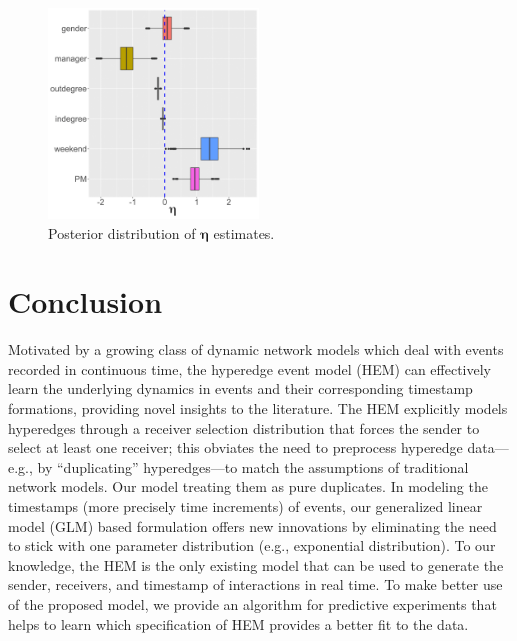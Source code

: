 \documentclass[ba]{imsart}
\numberwithin{equation}{section}
\theoremstyle{plain}
\begin{document}
			\begin{figure}[!t]
				\centering
				\includegraphics[width=0.4975\textwidth]{img/etaplotnew-1.png}	
				\caption {Posterior distribution of $\boldsymbol{\eta}$ estimates.}
				\label{figure:etaresults}
			\end{figure}	
	\section{Conclusion}\label{sec:conclusion}
	Motivated by a growing class of dynamic network models which deal with events recorded in continuous time, the hyperedge event model (HEM) can effectively learn the underlying dynamics in events and their corresponding timestamp formations, providing novel insights to the literature. The HEM explicitly models hyperedges through a receiver selection distribution that forces the sender to select at least one receiver; this obviates the need to preprocess hyperedge data---e.g., by ``duplicating'' hyperedges---to match the assumptions of traditional network models. Our model treating them as pure duplicates. In modeling the timestamps (more precisely time increments) of events, our generalized linear model (GLM) based formulation offers new innovations by eliminating the need to stick with one parameter distribution (e.g., exponential distribution). To our knowledge, the HEM is the only existing model that can be used to generate the sender, receivers, and timestamp of interactions in real time. To make better use of the proposed model, we provide an algorithm for predictive experiments that helps to learn which specification of HEM provides a better fit to the data. 
	
\end{document}
